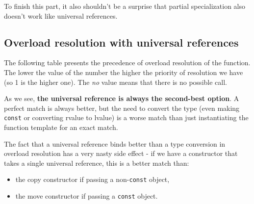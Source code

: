\documentclass[../main]{subfiles}
\begin{document}
    To finish this part, it also shouldn't be a surprise that partial
specialization also doesn't work like universal references.

\subsection{Overload resolution with universal references}
    The following table presents the precedence of overload resolution of
the function. The lower the value of the number the higher the priority
of resolution we have (so 1 is the higher one).
The \textit{no} value means that there is no possible call.
\begin{center}
    \footnotesize
\end{center}

    As we see, \textbf{the universal reference is always the second-best
option}. A perfect match is always better, but the need to convert the
type (even making \texttt{const} or converting rvalue to lvalue) is a
worse match than just instantiating the function template for an exact 
match.\newline

    The fact that a universal reference binds better than a type
conversion in overload resolution has a very nasty side effect -
if we have a constructor that takes a single universal reference, this is 
a better match than:
\begin{itemize}
    \item the copy constructor if passing a non-\texttt{const} object,
    \item the move constructor if passing a \texttt{const} object.
\end{itemize}
\end{document}
